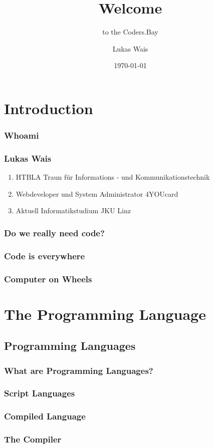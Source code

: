 \documentclass[aspectratio=169]{beamer}
\title{Welcome}
\subtitle{to the Coders.Bay}
\author{Lukas Wais}
\date{\today}
\begin{document}
\frame{\titlepage}
\frame{\tableofcontents}
\section{Introduction}
\subsubsection{Whoami}
\begin{frame}
  \frametitle{Lukas Wais}
  \begin{enumerate}
    \item HTBLA Traun für Informations - und Kommunikationstechnik
    \item Webdeveloper und System Administrator 4YOUcard
    \item Aktuell Informatikstudium JKU Linz
  \end{enumerate}
\end{frame}

\subsubsection{Do we really need code?}
\begin{frame}
  \frametitle{Code is everywhere}
\end{frame}

\begin{frame}
  \frametitle{Computer on Wheels}
\end{frame}

\section{The Programming Language}
\subsection{Programming Languages}
\begin{frame}
  \frametitle{What are Programming Languages?}
\end{frame}

\begin{frame}
  \frametitle{Script Languages}
\end{frame}

\begin{frame}
  \frametitle{Compiled Language}
\end{frame}

\begin{frame}
  \frametitle{The Compiler}
\end{frame}
\end{document}
